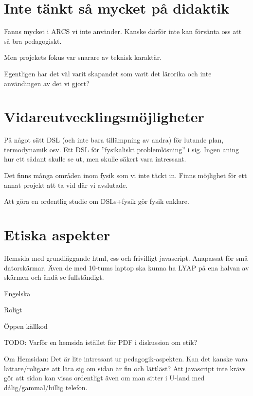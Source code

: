 \begin{binge}
\section{Inte tänkt så mycket på didaktik}

Fanns mycket i ARCS vi inte använder. Kanske därför inte kan förvänta oss att så bra pedagogiskt.

Men projekets fokus var snarare av teknisk karaktär.

Egentligen har det väl varit skapandet som varit det lärorika och inte användingen av det vi gjort?

\section{Vidareutvecklingsmöjligheter}

På något sätt DSL (och inte bara tillämpning av andra) för lutande plan, termodynamik osv. Ett DSL för ''fysikaliskt problemlösning'' i sig. Ingen aning hur ett sådant skulle se ut, men skulle säkert vara intressant.

Det finns många områden inom fysik som vi inte täckt in. Finns möjlighet för ett
annat projekt att ta vid där vi avslutade.

Att göra en ordentlig studie om DSLs+fysik gör fysik enklare.

\section{Etiska aspekter}

Hemsida med grundläggande html, css och frivilligt javascript. Anapassat för små datorskärmar. Även de med 10-tums laptop ska kunna ha LYAP på ena halvan av skärmen och ändå se fullständigt.

Engelska

Roligt

Öppen källkod

TODO: Varför en hemsida istället för PDF i diskussion om etik?

Om Hemsidan: 
  Det är lite intressant ur pedagogik-aspekten. Kan det
  kanske vara lättare/roligare att lära sig om sidan är fin och
  lättläst? Att javascript inte krävs gör att sidan kan visas ordentligt
  även om man sitter i U-land med dålig/gammal/billig telefon.


\end{binge}
